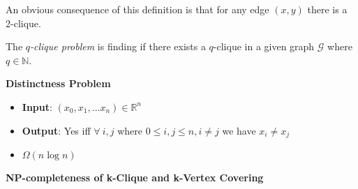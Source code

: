 An obvious consequence of this definition is that for any edge $(x,y)$ there is a 2-clique.

\begin{definition}
    The \textit{$q$-clique problem} is finding if there exists a $q$-clique in a given graph
    $\mathcal{G}$ where $q \in \mathbb{N}$.
\end{definition}

\textbf{Distinctness Problem}
\begin{itemize}
    \item \textbf{Input}: $(x_0, x_1,\dots x_n) \in \mathbb{R}^n$
    \item \textbf{Output}: Yes iff $\forall\ i,j$ where $0 \leq i,j \leq n, i \neq j$ we have $x_i \neq x_j$
    \item $\Omega(n\log n)$
\end{itemize}

\textbf{NP-completeness of k-Clique and k-Vertex Covering}
